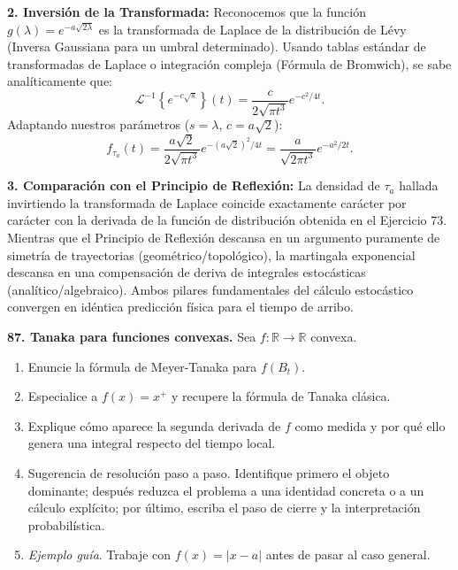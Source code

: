 \documentclass[11pt, letterpaper]{article}
\begin{document}
\begin{solucion}
    \textbf{2. Inversión de la Transformada:}
    Reconocemos que la función $g(\lambda) = e^{-a\sqrt{2\lambda}}$ es la transformada de Laplace de la distribución de Lévy (Inversa Gaussiana para un umbral determinado).
    Usando tablas estándar de transformadas de Laplace o integración compleja (Fórmula de Bromwich), se sabe analíticamente que:
    \[ \mathcal{L}^{-1}\left\{ e^{-c\sqrt{s}} \right\}(t) = \frac{c}{2\sqrt{\pi t^3}} e^{-c^2 / 4t}. \]
    Adaptando nuestros parámetros ($s = \lambda$, $c = a\sqrt{2}$):
    \[ f_{\tau_a}(t) = \frac{a\sqrt{2}}{2\sqrt{\pi t^3}} e^{-(a\sqrt{2})^2 / 4t} = \frac{a}{\sqrt{2\pi t^3}} e^{-a^2 / 2t}. \]

    \textbf{3. Comparación con el Principio de Reflexión:}
    La densidad de $\tau_a$ hallada invirtiendo la transformada de Laplace coincide exactamente carácter por carácter con la derivada de la función de distribución obtenida en el Ejercicio 73. 
    Mientras que el Principio de Reflexión descansa en un argumento puramente de simetría de trayectorias (geométrico/topológico), la martingala exponencial descansa en una compensación de deriva de integrales estocásticas (analítico/algebraico). Ambos pilares fundamentales del cálculo estocástico convergen en idéntica predicción física para el tiempo de arribo.
\end{solucion}

\newpage

\begin{ejercicio}
    \textbf{87. Tanaka para funciones convexas.} Sea $f:\mathbb{R}\rightarrow\mathbb{R}$ convexa.
    \begin{enumerate}
        \item Enuncie la fórmula de Meyer-Tanaka para $f(B_{t})$.
        \item Especialice a $f(x)=x^{+}$ y recupere la fórmula de Tanaka clásica.
        \item Explique cómo aparece la segunda derivada de $f$ como medida y por qué ello genera una integral respecto del tiempo local.
        \item Sugerencia de resolución paso a paso. Identifique primero el objeto dominante; después reduzca el problema a una identidad concreta o a un cálculo explícito; por último, escriba el paso de cierre y la interpretación probabilística.
        \item \textit{Ejemplo guía}. Trabaje con $f(x)=|x-a|$ antes de pasar al caso general.
    \end{enumerate}
\end{ejercicio}
\end{document}

